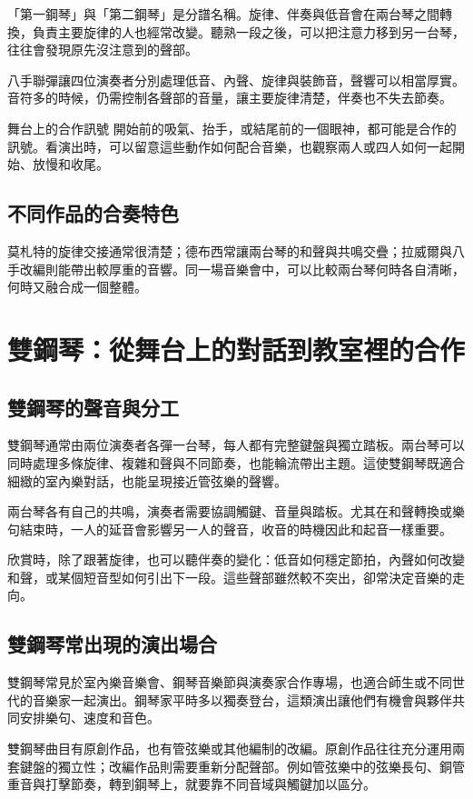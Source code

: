 \documentclass[UTF8,12pt,a4paper,fontset=none]{ctexart}
\begin{document}
「第一鋼琴」與「第二鋼琴」是分譜名稱。旋律、伴奏與低音會在兩台琴之間轉換，負責主要旋律的人也經常改變。聽熟一段之後，可以把注意力移到另一台琴，往往會發現原先沒注意到的聲部。

八手聯彈讓四位演奏者分別處理低音、內聲、旋律與裝飾音，聲響可以相當厚實。音符多的時候，仍需控制各聲部的音量，讓主要旋律清楚，伴奏也不失去節奏。

\begin{listen}{舞台上的合作訊號}
開始前的吸氣、抬手，或結尾前的一個眼神，都可能是合作的訊號。看演出時，可以留意這些動作如何配合音樂，也觀察兩人或四人如何一起開始、放慢和收尾。
\end{listen}

\subsection{不同作品的合奏特色}
莫札特的旋律交接通常很清楚；德布西常讓兩台琴的和聲與共鳴交疊；拉威爾與八手改編則能帶出較厚重的音響。同一場音樂會中，可以比較兩台琴何時各自清晰，何時又融合成一個整體。
\clearpage
\section{雙鋼琴：從舞台上的對話到教室裡的合作}

\subsection{雙鋼琴的聲音與分工}
雙鋼琴通常由兩位演奏者各彈一台琴，每人都有完整鍵盤與獨立踏板。兩台琴可以同時處理多條旋律、複雜和聲與不同節奏，也能輪流帶出主題。這使雙鋼琴既適合細緻的室內樂對話，也能呈現接近管弦樂的聲響。

兩台琴各有自己的共鳴，演奏者需要協調觸鍵、音量與踏板。尤其在和聲轉換或樂句結束時，一人的延音會影響另一人的聲音，收音的時機因此和起音一樣重要。

欣賞時，除了跟著旋律，也可以聽伴奏的變化：低音如何穩定節拍，內聲如何改變和聲，或某個短音型如何引出下一段。這些聲部雖然較不突出，卻常決定音樂的走向。

\subsection{雙鋼琴常出現的演出場合}
雙鋼琴常見於室內樂音樂會、鋼琴音樂節與演奏家合作專場，也適合師生或不同世代的音樂家一起演出。鋼琴家平時多以獨奏登台，這類演出讓他們有機會與夥伴共同安排樂句、速度和音色。

雙鋼琴曲目有原創作品，也有管弦樂或其他編制的改編。原創作品往往充分運用兩套鍵盤的獨立性；改編作品則需要重新分配聲部。例如管弦樂中的弦樂長句、銅管重音與打擊節奏，轉到鋼琴上，就要靠不同音域與觸鍵加以區分。
\end{document}
